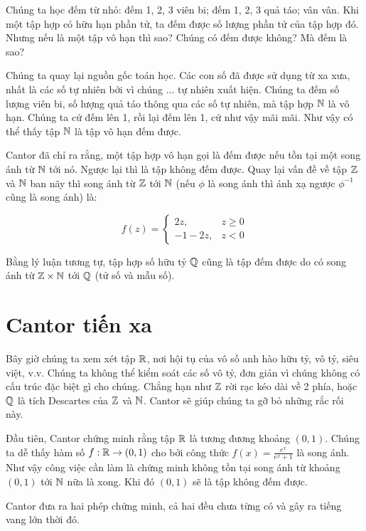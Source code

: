 Chúng ta học đếm từ nhỏ: đếm 1, 2, 3 viên bi; đếm 1, 2, 3 quả táo; vân vân.
Khi một tập hợp có hữu hạn phần tử, ta đếm được số lượng phần tử của tập hợp đó.
Nhưng nếu là một tập vô hạn thì sao? Chúng có đếm được không? Mà đếm là sao?

Chúng ta quay lại nguồn gốc toán học. Các con số đã được sử dụng từ xa xưa,
nhất là các số tự nhiên bởi vì chúng ... tự nhiên xuất hiện. Chúng ta đếm
số lượng viên bi, số lượng quả táo thông qua các số tự nhiên, mà 
tập hợp $\mathbb{N}$ là vô hạn. Chúng ta cứ đếm lên 1, rồi lại đếm lên 1, 
cứ như vậy mãi mãi. Như vậy có thể thấy tập $\mathbb{N}$ là tập vô hạn đếm được.

Cantor đã chỉ ra rằng, một tập hợp vô hạn gọi là đếm được nếu
tồn tại một song ánh từ $\mathbb{N}$ tới nó. Ngược lại thì là tập không đếm được.
Quay lại vấn đề về tập $\mathbb{Z}$ và $\mathbb{N}$
ban nãy thì song ánh từ $\mathbb{Z}$ tới $\mathbb{N}$ (nếu $\phi$ là song ánh
thì ánh xạ ngược $\phi^{-1}$ cũng là song ánh) là:

\begin{equation*}
    f(z) = \begin{cases}
        2z, & z \geq 0 \\
        -1-2z, & z < 0
    \end{cases}    
\end{equation*}

Bằng lý luận tương tự, tập hợp số hữu tỷ $\mathbb{Q}$ cũng là tập
đếm được do có song ánh từ $\mathbb{Z} \times \mathbb{N}$ tới $\mathbb{Q}$ (tử số
và mẫu số).

\section{Cantor tiến xa}

Bây giờ chúng ta xem xét tập $\mathbb{R}$, nơi hội tụ của vô số anh
hào hữu tỷ, vô tỷ, siêu việt, v.v. Chúng ta không thể kiểm soát
các số vô tỷ, đơn giản vì chúng không có cấu trúc đặc biệt gì cho chúng.
Chẳng hạn như $\mathbb{Z}$ rời rạc kéo dài về 2 phía, hoặc $\mathbb{Q}$
là tích Descartes của $\mathbb{Z}$ và $\mathbb{N}$. Cantor sẽ giúp chúng ta 
gỡ bỏ những rắc rối này.

Đầu tiên, Cantor chứng minh rằng tập $\mathbb{R}$ là tương đương khoảng
$(0, 1)$. Chúng ta dễ thấy hàm số $f: \mathbb{R} \to (0, 1)$ cho
bởi công thức $f(x) = \frac{e^x}{e^x + 1}$ là song ánh.
Như vậy công việc cần làm là chứng minh không tồn tại song
ánh từ khoảng $(0, 1)$ tới $\mathbb{N}$ nữa là xong. Khi đó $(0, 1)$
sẽ là tập không đếm được.

Cantor đưa ra hai phép chứng minh, cả hai đều chưa từng có và
gây ra tiếng vang lớn thời đó.

